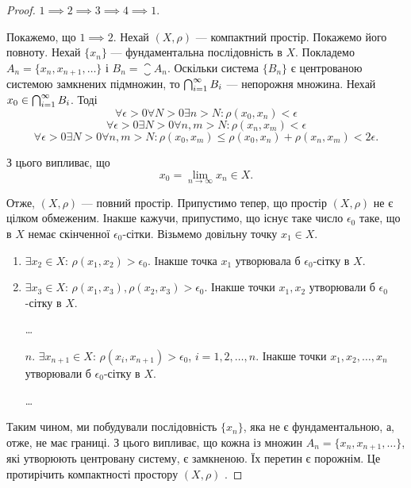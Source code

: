 \begin{proof} $1 \implies 2 \implies 3 \implies 4 \implies 1$.

Покажемо, що $1 \implies 2$. Нехай $(X, \rho)$ --- компактний
простір. Покажемо його повноту. Нехай $\{x_n\}$ ---
фундаментальна послідовність в $X$. Покладемо
$A_n = \{x_n, x_{n + 1}, \dots\}$ і $B_n = \closure A_n$. Оскільки система $\{B_n\}$ є
центрованою системою замкнених підмножин, то
$\operatorname*{\bigcap}_{i = 1}^\infty B_i$ ---
непорожня множина. Нехай $x_0 \in \operatorname*{\bigcap}_{i = 1}^\infty B_i$. Тоді
\begin{equation*}
    \forall \epsilon > 0 \forall N > 0 \exists n > N: \rho(x_0, x_n) < \epsilon
\end{equation*}
\begin{equation*}
    \forall \epsilon > 0 \exists N > 0 \forall n, m > N: \rho(x_n, x_m) < \epsilon
\end{equation*}
\begin{equation*}
    \forall \epsilon > 0 \exists N > 0 \forall n, m > N:
    \rho(x_0, x_m) \le \rho(x_0, x_n) + \rho(x_n, x_m) < 2 \epsilon.
\end{equation*}

З цього випливає, що
\begin{equation*}
    x_0 = \lim_{n \to \infty} x_n \in X.
\end{equation*}

Отже, $(X, \rho)$ --- повний простір.
Припустимо тепер, що простір $(X, \rho)$ не є цілком
обмеженим. Інакше кажучи, припустимо, що існує таке
число $\epsilon_0$ таке, що в $X$ немає скінченної $\epsilon_0$-сітки.
Візьмемо довільну точку $x_1 \in X$.
\begin{enumerate}
    \item $\exists x_2 \in  X$: $\rho(x_1, x_2) > \epsilon_0$.
    Інакше точка $x_1$ утворювала б $\epsilon_0$-сітку в $X$.

    \item $\exists x_3 \in  X$: $\rho(x_1, x_3), \rho(x_2, x_3) > \epsilon_0$.
    Інакше точки $x_1, x_2$ утворювали б $\epsilon_0$-сітку в $X$.

    \dots

    \item[$n$.] $\exists x_{n + 1} \in  X$: $\rho(x_i, x_{n + 1}) > \epsilon_0$,
    $i = 1, 2, \dots, n$.
    Інакше точки $x_1, x_2, \dots, x_n$ утворювали б $\epsilon_0$-сітку в $X$.
    
    \dots
\end{enumerate}

Таким чином, ми побудували послідовність $\{x_n\}$, яка не є
фундаментальною, а, отже, не має границі. З цього
випливає, що кожна із множин $A_n = \{x_n, x_{n +1}, \dots\}$, які
утворюють центровану систему, є замкненою. Їх перетин є
порожнім. Це протирічить компактності простору $(X, \rho)$ .


\end{proof}

